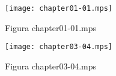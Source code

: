 \documentclass[a4paper]{article}
\begin{document}
\begin{figure}[htbp]
	\begin{center}
		\texttt{[image: chapter01-01.mps]}
	\end{center}
	\caption{Figura chapter01-01.mps}
\end{figure}

\begin{figure}[htpb]
	\begin{center}
		\texttt{[image: chapter03-04.mps]}
	\end{center}
	\caption{Figura chapter03-04.mps}
\end{figure}
\end{document}
